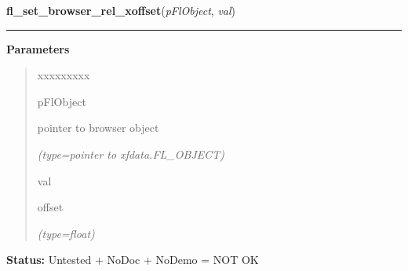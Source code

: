 \hspace{.8\funcindent}\begin{boxedminipage}{\funcwidth}

    \raggedright \textbf{fl\_set\_browser\_rel\_xoffset}(\textit{pFlObject}, \textit{val})

    \vspace{-1.5ex}

    \rule{\textwidth}{0.5\fboxrule}
\setlength{\parskip}{2ex}
\setlength{\parskip}{1ex}
      \textbf{Parameters}
      \vspace{-1ex}

      \begin{quote}
        \begin{Ventry}{xxxxxxxxx}

          \item[pFlObject]

          pointer to browser object

            {\it (type=pointer to xfdata.FL\_OBJECT)}

          \item[val]

          offset

            {\it (type=float)}

        \end{Ventry}

      \end{quote}

\textbf{Status:} Untested + NoDoc + NoDemo = NOT OK



    \end{boxedminipage}

    \label{xformslib:flbrowser:fl_get_browser_yoffset}

    \vspace{0.5ex}

